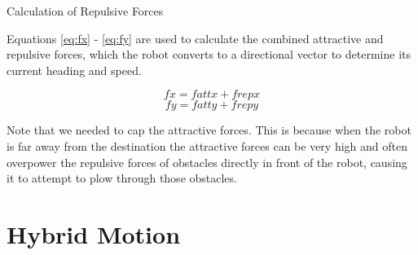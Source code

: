 \documentclass[12pt]{article}
\begin{document}
\begin{algorithm}[H]
\caption{Calculation of Repulsive Forces}
\label{alg:frep}
\begin{algorithmic}[1]

	\ENDIF
\ENDFOR

\end{algorithmic}
\end{algorithm}


Equations \ref{eq:fx} - \ref{eq:fy} are used to calculate the combined attractive and repulsive forces, which the robot converts to a directional vector to determine its current heading and speed.

\begin{equation}
fx = fattx + frepx
\label{eq:fx}
\end{equation} 
\begin{equation}
fy = fatty + frepy
\label{eq:fy}
\end{equation} 

Note that we needed to cap the attractive forces. This is because when the robot is far away from the destination the attractive forces can be very high and often overpower the repulsive forces of obstacles directly in front of the robot, causing it to attempt to plow through those obstacles.


\section{Hybrid Motion}
\label{sec:robotmotion}
\end{document}
